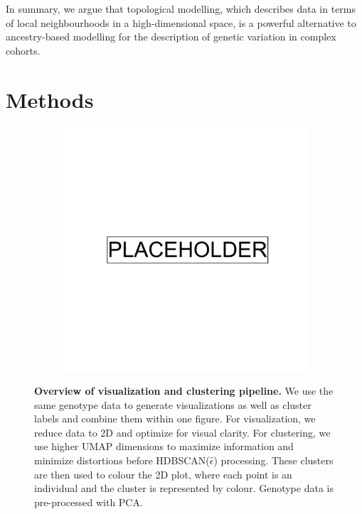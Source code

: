 In summary, we argue that topological modelling, which describes data in terms of local neighbourhoods in a high-dimensional space, is a powerful alternative to ancestry-based modelling for the description of genetic variation in complex cohorts.

\clearpage

\section{Methods}

\begin{figure}[!ht]
  \centering
  \begin{subfigure}[b]{0.9\linewidth}
\includegraphics[width=\linewidth]{placeholder.png}
  \end{subfigure}
  \caption[Overview of visualization and clustering pipeline]{\textbf{Overview of visualization and clustering pipeline.} We use the same genotype data to generate visualizations as well as cluster labels and combine them within one figure. For visualization, we reduce data to 2D and optimize for visual clarity. For clustering, we use higher UMAP dimensions to maximize information and minimize distortions before HDBSCAN($\hat{\epsilon}$) processing. These clusters are then used to colour the 2D plot, where each point is an individual and the cluster is represented by colour. Genotype data is pre-processed with PCA.}
    \label{fig:method}
\end{figure}

